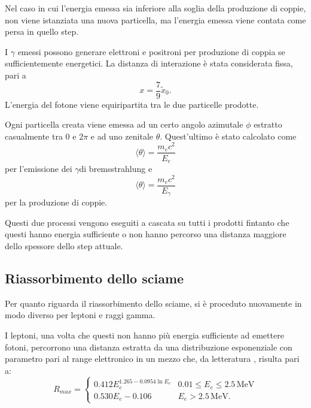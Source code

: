 \documentclass[10pt,a4paper,usenatbib]{article}
\newcommand*{\unit}[1]{\ensuremath{\mathrm{\,#1}}}                              %
\begin{document}
Nel caso in cui l'energia emessa sia inferiore alla soglia della produzione di coppie, non viene istanziata una nuova particella, ma l'energia emessa viene contata come persa in quello step.

\bigskip

I $\gamma$ emessi possono generare elettroni e positroni per produzione di coppia se sufficientemente energetici. La distanza di interazione è stata considerata fissa, pari a 
\begin{equation}
x = \frac{7}{9}\tilde{x}_0.
\end{equation}
L'energia del fotone viene equiripartita tra le due particelle prodotte.

Ogni particella creata viene emessa ad un certo angolo azimutale $\phi$ estratto casualmente tra 0 e $2\pi$ e ad uno zenitale $\theta$. Quest'ultimo  è stato calcolato come
\begin{equation}
\langle\theta\rangle = \frac{m_e c^2}{E_e}
\end{equation}
per l'emissione dei $\gamma$di bremsstrahlung e 
\begin{equation}
\langle\theta\rangle = \frac{m_e c^2}{E_\gamma}
\end{equation}
per la produzione di coppie. 

Questi due processi vengono eseguiti a cascata su tutti i prodotti fintanto che questi hanno energia sufficiente o non hanno percorso una distanza maggiore dello spessore dello step attuale.

\subsection{Riassorbimento dello sciame}
\label{subsec:riassorb}
Per quanto riguarda il riassorbimento dello sciame, si è proceduto nuovamente in modo diverso per leptoni e raggi gamma. 

I leptoni, una volta che questi non hanno più energia sufficiente ad emettere fotoni, percorrono una distanza estratta da una distribuzione esponenziale con parametro pari al range elettronico in un mezzo che, da letteratura \citep{RevModPhys.24.28}, risulta pari a: 
\begin{equation}
R_{max} = \begin{cases} 0.412 E_e^{1.265-0.0954 \ln{E_e}}     & 0.01\le E_e \le 2.5\unit{MeV} \\ 
                                          0.530 E_e - 0.106                                   & E_e > 2.5\unit{MeV}. 
                   \end{cases}
\end{equation}
\end{document}
